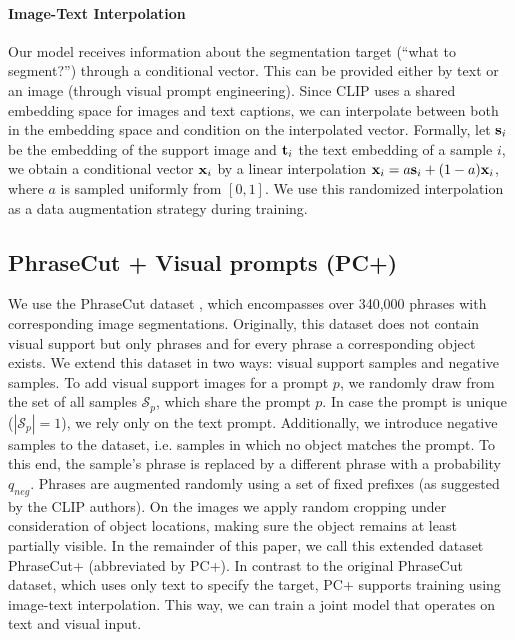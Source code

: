 \documentclass[10pt,twocolumn,letterpaper]{article}
\begin{document}
\paragraph{Image-Text Interpolation}
\label{sec:text_image_interpolation}
Our model receives information about the segmentation target (``what to segment?'') through a conditional vector. This can be provided either by text or an image (through visual prompt engineering). Since CLIP uses a shared embedding space for images and text captions, we can interpolate between both in the embedding space and condition on the interpolated vector.
Formally, let $\mathbf{s}_i$ be the embedding of the support image and $\mathbf{t}_i$ the text embedding of a sample $i$, we obtain a conditional vector $\mathbf{x}_i$ by a linear interpolation $\mathbf{x}_i= a \mathbf{s}_i + (1-a) \mathbf{x}_i$, where $a$ is sampled uniformly from $[0, 1]$. 
We use this randomized interpolation as a data augmentation strategy during training.







\subsection{PhraseCut + Visual prompts (PC+)}

We use the PhraseCut dataset \cite{wu20phrasecut}, which encompasses over 340,000 phrases with corresponding image segmentations.
Originally, this dataset does not contain visual support but only phrases and for every phrase a corresponding object exists. We extend this dataset in two ways: visual support samples and negative samples. 
To add visual support images for a prompt $p$, we randomly draw from the set of all samples $\mathcal{S}_p$, which share the prompt $p$. In case the prompt is unique ($|\mathcal{S}_p| = 1$), we rely only on the text prompt. 
Additionally, we introduce negative samples to the dataset, i.e. samples in which no object matches the prompt. To this end, the sample's phrase is replaced by a different phrase with a probability $q_{neg}$.
Phrases are augmented randomly using a set of fixed prefixes (as suggested by the CLIP authors). On the images we apply random cropping under consideration of object locations, making sure the object remains at least partially visible.
In the remainder of this paper, we call this extended dataset PhraseCut+ (abbreviated by PC+). In contrast to the original PhraseCut dataset, which uses only text to specify the target, PC+ supports training using image-text interpolation. This way, we can train a joint model that operates on text and visual input.
\end{document}
